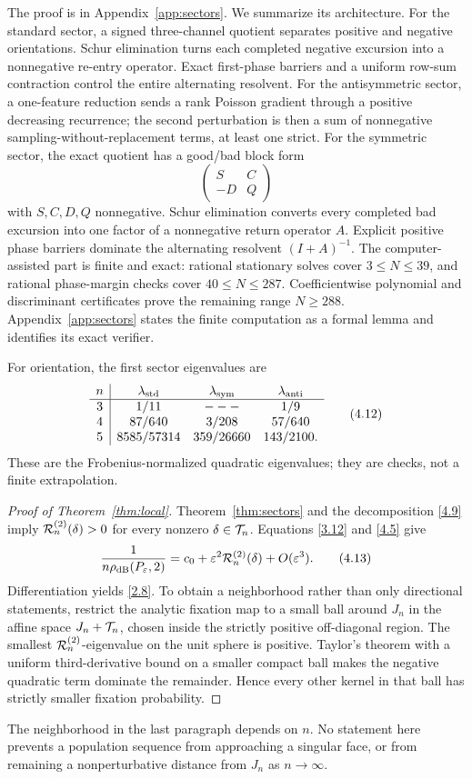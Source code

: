 The proof is in Appendix~\ref{app:sectors}.  We summarize its architecture.
For the standard sector, a signed three-channel quotient separates positive
and negative orientations.  Schur elimination turns each completed negative
excursion into a nonnegative re-entry operator.  Exact first-phase barriers
and a uniform row-sum contraction control the entire alternating resolvent.
For the antisymmetric sector, a one-feature reduction sends a rank Poisson
gradient through a positive decreasing recurrence; the second perturbation
is then a sum of nonnegative sampling-without-replacement terms, at least one
strict.  For the symmetric sector, the exact quotient has a good/bad block form
\[
 \begin{pmatrix}S&C\\-D&Q\end{pmatrix}                     \tag{4.11}\label{4.11}
\]
with $S,C,D,Q$ nonnegative.  Schur elimination converts every completed bad
excursion into one factor of a nonnegative return operator $A$.  Explicit
positive phase barriers dominate the alternating resolvent $(I+A)^{-1}$.
The computer-assisted part is finite and exact: rational stationary solves
cover $3\le N\le39$, and rational phase-margin checks cover
$40\le N\le287$.  Coefficientwise polynomial and discriminant certificates
prove the remaining range $N\ge288$.  Appendix~\ref{app:sectors} states the
finite computation as a formal lemma and identifies its exact verifier.

For orientation, the first sector eigenvalues are
\[
\begin{array}{c|ccc}
n&\lambda_{\rm std}&\lambda_{\rm sym}&\lambda_{\rm anti}\\ \hline
3&1/11&---&1/9\\
4&87/640&3/208&57/640\\
5&8585/57314&359/26660&143/2100.
\end{array}                                                  \tag{4.12}\label{4.12}
\]
These are the Frobenius-normalized quadratic eigenvalues; they are checks,
not a finite extrapolation.

\begin{proof}[Proof of Theorem~\ref{thm:local}]
Theorem~\ref{thm:sectors} and the decomposition \eqref{4.9} imply
$\mathcal R^{(2)}_{n}(\delta)>0$ for every nonzero $\delta\in\mathcal T_n$.  Equations
\eqref{3.12} and \eqref{4.5} give
\[
 \frac1{n\rho_{\mathrm{dB}}(P_\varepsilon,2)}
 =c_0+\varepsilon^2\mathcal R^{(2)}_{n}(\delta)+O(\varepsilon^3).         \tag{4.13}\label{4.13}
\]
Differentiation yields \eqref{2.8}.  To obtain a neighborhood rather than
only directional statements, restrict the analytic fixation map to a small
ball around $J_n$ in the affine space $J_n+\mathcal T_n$, chosen inside the
strictly positive off-diagonal region.  The smallest
$\mathcal R^{(2)}_{n}$-eigenvalue on the unit sphere is positive.  Taylor's theorem with
a uniform third-derivative bound on a smaller compact ball makes the
negative quadratic term dominate the remainder.  Hence every other kernel
in that ball has strictly smaller fixation probability.
\end{proof}

\begin{remark}
The neighborhood in the last paragraph depends on $n$.  No statement here
prevents a population sequence from approaching a singular face, or from
remaining a nonperturbative distance from $J_n$ as $n\to\infty$.
\end{remark}
